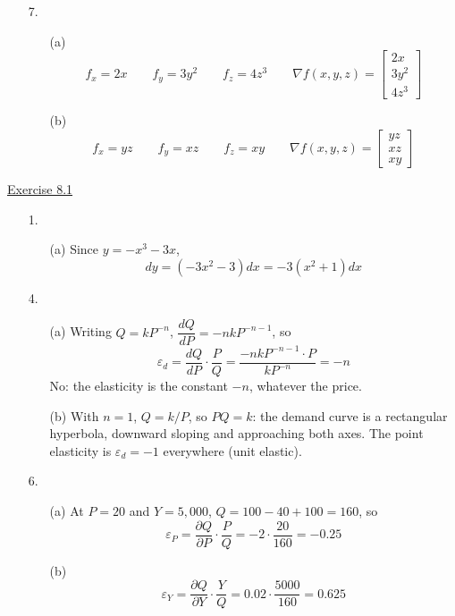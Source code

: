 \begin{enumerate}
\begin{enumerate}
\end{enumerate}

\item[7.]
\begin{enumerate}
\item[(a)] 
\[f_{x}=2x \qquad f_{y}=3y^{2} \qquad f_{z}=4z^{3} \qquad \nabla f(x,y,z)=\left[\begin{array}{c}2x \\ 3y^{2} \\ 4z^{3}\end{array}\right]\]

\item[(b)] 
\[f_{x}=yz \qquad f_{y}=xz \qquad f_{z}=xy \qquad \nabla f(x,y,z)=\left[\begin{array}{c}yz \\ xz \\ xy\end{array}\right]\]

\end{enumerate}

\end{enumerate}

\underline{Exercise 8.1}
\begin{enumerate}
\item[1.]
\begin{enumerate}
\item[(a)] Since $y=-x^{3}-3x$, 
\[dy=\left(-3x^{2}-3\right)dx=-3\left(x^{2}+1\right)dx\]

\end{enumerate}

\item[4.]
\begin{enumerate}
\item[(a)] Writing $Q=kP^{-n}$, $\dfrac{dQ}{dP}=-nkP^{-n-1}$, so
\[\varepsilon_{d}=\frac{dQ}{dP}\cdot\frac{P}{Q}=\frac{-nkP^{-n-1}\cdot P}{kP^{-n}}=-n\]
No: the elasticity is the constant $-n$, whatever the price.
\item[(b)] With $n=1$, $Q=k/P$, so $PQ=k$: the demand curve is a rectangular hyperbola, downward sloping and approaching both axes. The point elasticity is $\varepsilon_{d}=-1$ everywhere (unit elastic).
\end{enumerate}

\item[6.]
\begin{enumerate}
\item[(a)] At $P=20$ and $Y=5{,}000$, $Q=100-40+100=160$, so
\[\varepsilon_{P}=\frac{\partial Q}{\partial P}\cdot\frac{P}{Q}=-2\cdot\frac{20}{160}=-0.25\]

\item[(b)] 
\[\varepsilon_{Y}=\frac{\partial Q}{\partial Y}\cdot\frac{Y}{Q}=0.02\cdot\frac{5000}{160}=0.625\]

\end{enumerate}

\end{enumerate}

